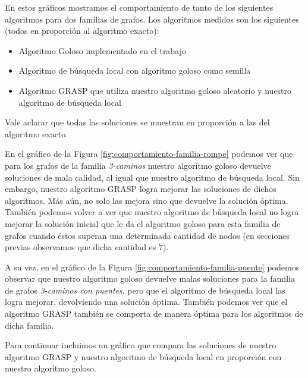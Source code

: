 En estos gráficos mostramos el comportamiento de tanto de los siguientes algoritmos para dos familias de grafos. Los algoritmos medidos son los siguientes (todos en proporción al algoritmo exacto):

\begin{itemize}
 \item Algoritmo Goloso implementado en el trabajo
 \item Algoritmo de búsqueda local con algoritmo goloso como semilla
 \item Algoritmo GRASP que utiliza nuestro algoritmo goloso aleatorio y nuestro algoritmo de búsqueda local
\end{itemize}

Vale aclarar que todas las soluciones se muestran en proporción a las del algoritmo exacto.

En el gráfico de la Figura \ref{fig:comportamiento-familia-rompe} podemos ver que para los grafos de la familia \emph{3-caminos} nuestro algoritmo goloso devuelve soluciones de mala calidad, al igual que nuestro algoritmo de búsqueda local. Sin embargo, nuestro algoritmo GRASP logra mejorar las soluciones de dichos algoritmos. Más aún, no solo las mejora sino que devuelve la solución óptima. También podemos volver a ver que nuestro algoritmo de búsqueda local no logra mejorar la solución inicial que le da el algoritmo goloso para esta familia de grafos cuando éstos superan una determinada cantidad de nodos (en secciones previas observamos que dicha cantidad es $7$).

A su vez, en el gráfico de la Figura \ref{fig:comportamiento-familia-puente} podemos observar que nuestro algoritmo goloso devuelve malas soluciones para la familia de grafos \emph{3-caminos con puentes}, pero que el algoritmo de búsqueda local las logra mejorar, devolviendo una solución óptima. También podemos ver que el algoritmo GRASP también se comporta de manera óptima para los algoritmos de dicha familia.

Para continuar incluimos un gráfico que compara las soluciones de nuestro algoritmo GRASP y nuestro algoritmo de búsqueda local en proporción con nuestro algoritmo goloso.

